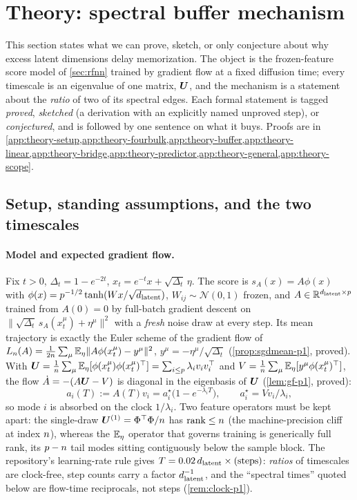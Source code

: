 \section{Theory: spectral buffer mechanism}
\label{sec:theory}

This section states what we can prove, sketch, or only conjecture about why excess latent dimensions delay memorization. The object is the frozen-feature score model of \cref{sec:rfnn} trained by gradient flow at a fixed diffusion time; every timescale is an eigenvalue of one matrix, $\bm{U}$, and the mechanism is a statement about the \emph{ratio} of two of its spectral edges. Each formal statement is tagged \emph{proved}, \emph{sketched} (a derivation with an explicitly named unproved step), or \emph{conjectured}, and is followed by one sentence on what it buys. Proofs are in \cref{app:theory-setup,app:theory-fourbulk,app:theory-buffer,app:theory-linear,app:theory-bridge,app:theory-predictor,app:theory-general,app:theory-scope}.

\subsection{Setup, standing assumptions, and the two timescales}
\label{sec:theory-setup}

\paragraph{Model and expected gradient flow.}
Fix $t>0$, $\Delta_t=1-e^{-2t}$, $x_t=e^{-t}x+\sqrt{\Delta_t}\,\eta$. The score is $s_A(x)=A\phi(x)$ with $\phi(x)=p^{-1/2}\tanh(Wx/\sqrt{d_{\mathrm{latent}}})$, $W_{ij}\sim\mathcal N(0,1)$ frozen, and $A\in\mathbb{R}^{d_{\mathrm{latent}}\times p}$ trained from $A(0)=0$ by full-batch gradient descent on $\|\sqrt{\Delta_t}\,s_A(x_t^\mu)+\eta^\mu\|^2$ with a \emph{fresh} noise draw at every step. Its mean trajectory is exactly the Euler scheme of the gradient flow of $L_{n}(A)=\tfrac1{2n}\sum_\mu\mathbb{E}_\eta\|A\phi(x_t^\mu)-y^\mu\|^2$, $y^\mu=-\eta^\mu/\sqrt{\Delta_t}$ (\cref{prop:sgdmean-p1}, proved). With $\bm{U}=\tfrac1{n}\sum_\mu\mathbb{E}_\eta[\phi(x^\mu_t)\phi(x^\mu_t)^{\top}]=\sum_{i\le p}\lambda_iv_iv_i^{\top}$ and $V=\tfrac1{n}\sum_\mu\mathbb{E}_\eta[y^\mu\phi(x^\mu_t)^{\top}]$, the flow $\dot A=-(A\bm{U}-V)$ is diagonal in the eigenbasis of $\bm{U}$ (\cref{lem:gf-p1}, proved):
\begin{equation}\label{eq:mode-decay-main}
a_i(T):=A(T)v_i=a_i^\star\bigl(1-e^{-\lambda_iT}\bigr),\qquad a_i^\star=Vv_i/\lambda_i ,
\end{equation}
so mode $i$ is absorbed on the clock $1/\lambda_i$. Two feature operators must be kept apart: the single-draw $\bm{U}^{(1)}=\Phi^{\top}\Phi/n$ has $\operatorname{rank}\le n$ (the machine-precision cliff at index $n$), whereas the $\mathbb{E}_\eta$ operator that governs training is generically full rank, its $p-n$ tail modes sitting contiguously below the sample block. The repository's learning-rate rule gives $T=0.02\,d_{\mathrm{latent}}\times(\text{steps})$: \emph{ratios} of timescales are clock-free, step counts carry a factor $d_{\mathrm{latent}}^{-1}$, and the ``spectral times'' quoted below are flow-time reciprocals, not steps (\cref{rem:clock-p1}).

